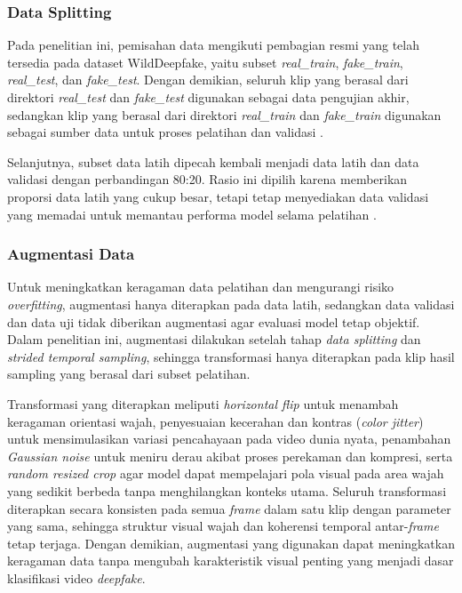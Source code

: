 \subsubsection{Data Splitting}
Pada penelitian ini, pemisahan data mengikuti pembagian resmi yang telah tersedia pada dataset WildDeepfake, yaitu subset \textit{real\_train}, \textit{fake\_train}, \textit{real\_test}, dan \textit{fake\_test}. Dengan demikian, seluruh klip yang berasal dari direktori \textit{real\_test} dan \textit{fake\_test} digunakan sebagai data pengujian akhir, sedangkan klip yang berasal dari direktori \textit{real\_train} dan \textit{fake\_train} digunakan sebagai sumber data untuk proses pelatihan dan validasi \cite{Zi2024}. \par

Selanjutnya, subset data latih dipecah kembali menjadi data latih dan data validasi dengan perbandingan 80:20. Rasio ini dipilih karena memberikan proporsi data latih yang cukup besar, tetapi tetap menyediakan data validasi yang memadai untuk memantau performa model selama pelatihan \cite{joseph2022optimalratio,bichri2024traintestsplitratio}. \par

\subsubsection{Augmentasi Data}
Untuk meningkatkan keragaman data pelatihan dan mengurangi risiko \textit{overfitting}, augmentasi hanya diterapkan pada data latih, sedangkan data validasi dan data uji tidak diberikan augmentasi agar evaluasi model tetap objektif. Dalam penelitian ini, augmentasi dilakukan setelah tahap \textit{data splitting} dan \textit{strided temporal sampling}, sehingga transformasi hanya diterapkan pada klip hasil sampling yang berasal dari subset pelatihan. \par 

Transformasi yang diterapkan meliputi \textit{horizontal flip} untuk menambah keragaman orientasi wajah, penyesuaian kecerahan dan kontras (\textit{color jitter}) untuk mensimulasikan variasi pencahayaan pada video dunia nyata, penambahan \textit{Gaussian noise} untuk meniru derau akibat proses perekaman dan kompresi, serta \textit{random resized crop} agar model dapat mempelajari pola visual pada area wajah yang sedikit berbeda tanpa menghilangkan konteks utama. Seluruh transformasi diterapkan secara konsisten pada semua \textit{frame} dalam satu klip dengan parameter yang sama, sehingga struktur visual wajah dan koherensi temporal antar-\textit{frame} tetap terjaga. Dengan demikian, augmentasi yang digunakan dapat meningkatkan keragaman data tanpa mengubah karakteristik visual penting yang menjadi dasar klasifikasi video \textit{deepfake}. \par

